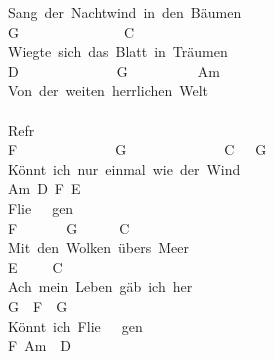 \documentclass[]{book}
\begin{document}
Sang~der~Nachtwind~in~den~Bäumen\\
G~~~~~~~~~~~~~~~C\\
Wiegte~sich~das~Blatt~in~Träumen\\
D~~~~~~~~~~~~~~G~~~~~~~~~~Am\\
Von~der~weiten~herrlichen~Welt\\
~\\
Refr\\
F~~~~~~~~~~~~~~G~~~~~~~~~~~~~~C~~~G\\
Könnt~ich~nur~einmal~wie~der~Wind\\
Am~D~F~E\\
Flie~~~gen\\
F~~~~~~~G~~~~~~C~~~~~~~~~~~~~\\
Mit~den~Wolken~übers~Meer\\
\hspace*{0.333em}\hspace*{0.333em}\hspace*{0.333em}\hspace*{0.333em}\hspace*{0.333em}\hspace*{0.333em}\hspace*{0.333em}\hspace*{0.333em}\hspace*{0.333em}E~~~~~C~~~~~~~~~~~\\
Ach~mein~Leben~gäb~ich~her\\
\hspace*{0.333em}\hspace*{0.333em}\hspace*{0.333em}\hspace*{0.333em}\hspace*{0.333em}\hspace*{0.333em}\hspace*{0.333em}\hspace*{0.333em}\hspace*{0.333em}\hspace*{0.333em}\hspace*{0.333em}G~~F~~G\\
Könnt~ich~Flie~~~gen\\
\hspace*{0.333em}\hspace*{0.333em}\hspace*{0.333em}\hspace*{0.333em}\hspace*{0.333em}\hspace*{0.333em}\hspace*{0.333em}\hspace*{0.333em}\hspace*{0.333em}\hspace*{0.333em}\hspace*{0.333em}\hspace*{0.333em}\hspace*{0.333em}\hspace*{0.333em}F~Am~~D\\
\end{document}
